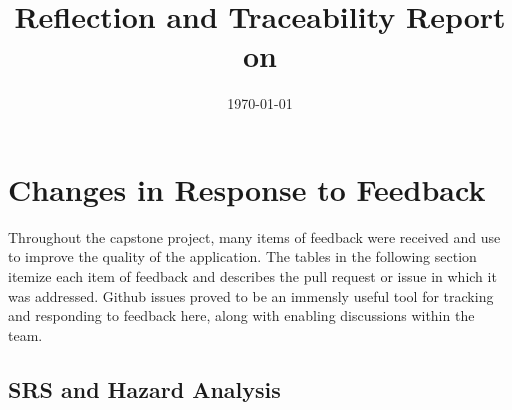 \documentclass{article}
\title{Reflection and Traceability Report on \progname}
\author{\authname}
\date{}
\date{\today}
\begin{document}
\maketitle

\section{Changes in Response to Feedback}
Throughout the capstone project, many items of feedback were received and use to improve the quality of the application.
The tables in the following section itemize each item of feedback and describes the pull request or issue in which it was addressed.
Github issues proved to be an immensly useful tool for tracking and responding to feedback here, along with enabling discussions
within the team.

\subsection{SRS and Hazard Analysis}
\end{document}
